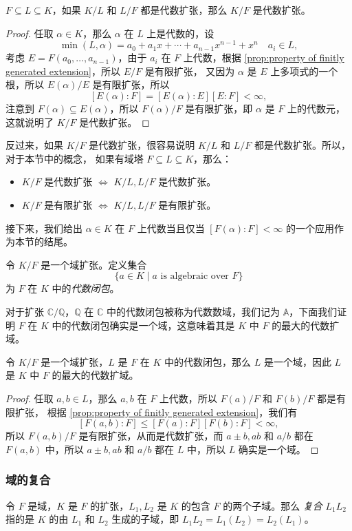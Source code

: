 \begin{theorem}
  $F\subseteq L\subseteq K$，如果 $K/L$ 和 $L/F$ 都是代数扩张，那么 $K/F$ 是代数扩张。
\end{theorem} 
\begin{proof}
  任取 $\alpha\in K$，那么 $\alpha$ 在 $L$ 上是代数的，设
  \[
    \min(L,\alpha)=a_0+a_1x+\cdots+a_{n-1}x^{n-1}+x^n\quad a_i\in L,  
  \]
  考虑 $E=F(a_0,\dots,a_{n-1})$，由于 $a_i$ 在 $F$ 上代数，根据
  \autoref{prop:property of finitly generated extension}，所以 $E/F$ 是有限扩张，
  又因为 $\alpha$ 是 $E$ 上多项式的一个根，所以 $E(\alpha)/E$ 是有限扩张，所以
  \[
    [E(\alpha):F]=[E(\alpha):E][E:F]  <\infty,
  \]
  注意到 $F(\alpha)\subseteq E(\alpha)$，所以 $F(\alpha)/F$ 是有限扩张，即 $\alpha$ 是
  $F$ 上的代数元，这就说明了 $K/F$ 是代数扩张。
\end{proof}

反过来，如果 $K/F$ 是代数扩张，很容易说明 $K/L$ 和 $L/F$ 都是代数扩张。所以，对于本节中的概念，
如果有域塔 $F\subseteq L\subseteq K$，那么：
\begin{itemize}
  \item $K/F$ 是代数扩张 $\Leftrightarrow$ $K/L,L/F$ 是代数扩张。
  \item $K/F$ 是有限扩张 $\Leftrightarrow$ $K/L,L/F$ 是有限扩张。
\end{itemize}

接下来，我们给出 $\alpha\in K$ 在 $F$ 上代数当且仅当 $[F(\alpha):F]<\infty$ 的一个应用作为本节的结尾。

\begin{definition}\label{def:closure of extension}
  令 $K/F$ 是一个域扩张。定义集合
  \[
    \{a\in K\mid \text{$a$ is algebraic over $F$}\}  
  \]
  为 $F$ 在 $K$ 中的\emph{代数闭包}。
\end{definition}

对于扩张 $\mathbb{C}/\mathbb{Q}$，$\mathbb{Q}$ 在 $\mathbb{C}$ 中的代数闭包被称为代数数域，我们记为
$\mathbb{A}$，下面我们证明 $F$ 在 $K$ 中的代数闭包确实是一个域，这意味着其是 $K$ 中 $F$ 的最大的代数扩域。

\begin{proposition}
  令 $K/F$ 是一个域扩张，$L$ 是 $F$ 在 $K$ 中的代数闭包，那么 $L$ 是一个域，因此 $L$
  是 $K$ 中 $F$ 的最大的代数扩域。
\end{proposition}
\begin{proof}
  任取 $a,b\in L$，那么 $a,b$ 在 $F$ 上代数，所以 $F(a)/F$ 和 $F(b)/F$ 都是有限扩张，
  根据 \autoref{prop:property of finitly generated extension}，我们有
  \[
    [F(a,b):F]\leq [F(a):F][F(b):F]<\infty,  
  \]
  所以 $F(a,b)/F$ 是有限扩张，从而是代数扩张，而 $a\pm b,ab$ 和 $a/b$ 都在 $F(a,b)$
  中，所以 $a\pm b,ab$ 和 $a/b$ 都在 $L$ 中，所以 $L$ 确实是一个域。
\end{proof}

\subsubsection{域的复合}

令 $F$ 是域，$K$ 是 $F$ 的扩张，$L_1,L_2$ 是 $K$ 的包含 $F$ 的两个子域。那么
\emph{复合} $L_1L_2$ 指的是 $K$ 的由 $L_1$ 和 $L_2$ 生成的子域，即
$L_1L_2=L_1(L_2)=L_2(L_1)$。






